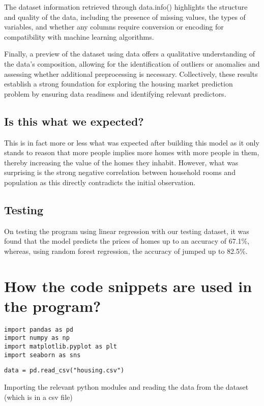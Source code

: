 \documentclass{article}
\begin{document}
The dataset information retrieved through data.info() highlights the structure and quality of the data, including the presence of missing values, the types of variables, and whether any columns require conversion or encoding for compatibility with machine learning algorithms. 

Finally, a preview of the dataset using data offers a qualitative understanding of the data’s composition, allowing for the identification of outliers or anomalies and assessing whether additional preprocessing is necessary. Collectively, these results establish a strong foundation for exploring the housing market prediction problem by ensuring data readiness and identifying relevant predictors.

\subsection{Is this what we expected?}
This is in fact more or less what was expected after building this model as it only stands to reason that more people implies more homes with more people in them, thereby increasing the value of the homes they inhabit. However, what was surprising is the strong negative correlation between household rooms and population as this directly contradicts the initial observation.

\subsection{Testing}
On testing the program using linear regression with our testing dataset, it was found that the model predicts the prices of homes up to an accuracy of 67.1\%, whereas, using random forest regression, the accuracy of jumped up to 82.5\%.

\section{How the code snippets are used in the program?}

\begin{verbatim}
import pandas as pd
import numpy as np
import matplotlib.pyplot as plt
import seaborn as sns
\end{verbatim}
\begin{verbatim}
data = pd.read_csv("housing.csv")
\end{verbatim}
\begin{center}
Importing the relevant python modules and reading the data from the dataset (which is in a csv file)
\end{center}
\end{document}

